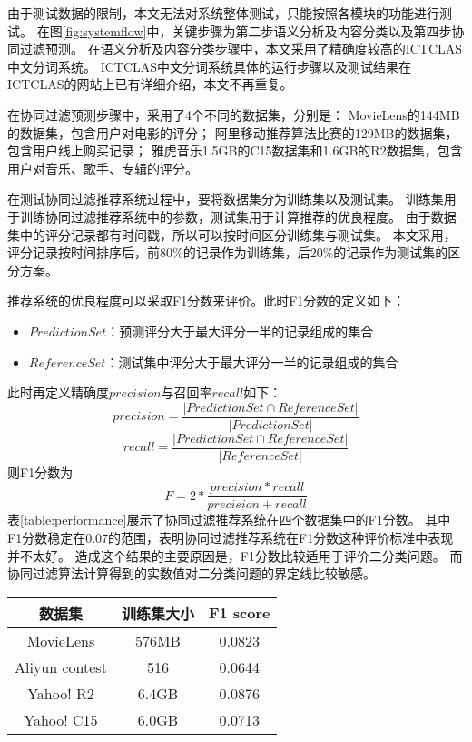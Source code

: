 由于测试数据的限制，本文无法对系统整体测试，只能按照各模块的功能进行测试。
在图\ref{fig:systemflow}中，关键步骤为第二步语义分析及内容分类以及第四步协同过滤预测。
在语义分析及内容分类步骤中，本文采用了精确度较高的ICTCLAS中文分词系统\parencite{刘群2004基于层叠隐马模型的汉语词法分析}。
ICTCLAS中文分词系统具体的运行步骤以及测试结果在ICTCLAS的网站上已有详细介绍，本文不再重复。

在协同过滤预测步骤中，采用了4个不同的数据集，分别是：
MovieLens的144MB的数据集，包含用户对电影的评分；
阿里移动推荐算法比赛的129MB的数据集，包含用户线上购买记录；
雅虎音乐1.5GB的C15数据集和1.6GB的R2数据集，包含用户对音乐、歌手、专辑的评分。

在测试协同过滤推荐系统过程中，要将数据集分为训练集以及测试集。
训练集用于训练协同过滤推荐系统中的参数，测试集用于计算推荐的优良程度。
由于数据集中的评分记录都有时间戳，所以可以按时间区分训练集与测试集。
本文采用，评分记录按时间排序后，前80\%的记录作为训练集，后20\%的记录作为测试集的区分方案。

推荐系统的优良程度可以采取F1分数来评价。此时F1分数的定义如下：
\begin{center}
\begin{itemize}
	\item $PredictionSet$：预测评分大于最大评分一半的记录组成的集合
	\item $ReferenceSet$：测试集中评分大于最大评分一半的记录组成的集合
\end{itemize}
\end{center}
此时再定义精确度$precision$与召回率$recall$如下：
\begin{equation}
precision= \frac{|PredictionSet\cap ReferenceSet|}{|PredictionSet|}
\end{equation}
\begin{equation}
recall= \frac{|PredictionSet\cap ReferenceSet|}{|ReferenceSet|}
\end{equation}
则F1分数为
\begin{equation}
F= 2* \frac{precision*recall}{precision+recall}
\end{equation}
表\ref{table:performance}展示了协同过滤推荐系统在四个数据集中的F1分数。
其中F1分数稳定在0.07的范围，表明协同过滤推荐系统在F1分数这种评价标准中表现并不太好。
造成这个结果的主要原因是，F1分数比较适用于评价二分类问题。
而协同过滤算法计算得到的实数值对二分类问题的界定线比较敏感。
\begin{center}
\label{table:performance}
\begin{tabular}{c|c|c}
 \hline
数据集 & 训练集大小 & F1 score \\ \hline
MovieLens & 576MB & 0.0823 \\ \hline
Aliyun contest & 516 & 0.0644 \\ \hline
Yahoo! R2 & 6.4GB & 0.0876 \\ \hline
Yahoo! C15 & 6.0GB & 0.0713 \\ \hline
\end{tabular}
\end{center}

